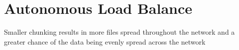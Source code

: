 \chapter{Autonomous Load Balance}
\label{chapter:auto-balance}

Smaller chunking results in more files spread throughout the  network and a greater chance of the data being evenly spread across the network